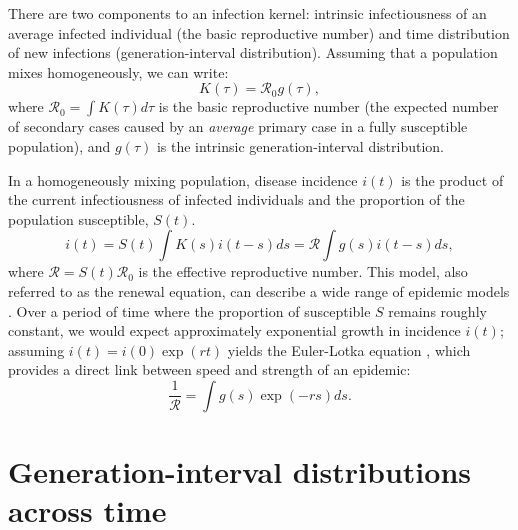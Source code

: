 \documentclass[12pt]{article}
\newcommand{\RR}{\ensuremath{{\mathcal R}}}
\newcommand{\comment}[3]{\textcolor{#1}{\textbf{[#2: }\textsl{#3}\textbf{]}}}
\newcommand{\jd}[1]{\comment{cyan}{JD}{#1}}
\newcommand{\dc}[1]{\comment{blue}{DC}{#1}}
\begin{document}
There are two components to an infection kernel: intrinsic infectiousness of an average infected individual (the basic reproductive number) and time distribution of new infections (generation-interval distribution).
Assuming that a population mixes homogeneously, we can write: 
\begin{equation}
K(\tau) = \RR_0 g(\tau),
\end{equation}
where $\RR_0 = \int K(\tau) d\tau$ is the basic reproductive number (the expected number of secondary cases caused by an \emph{average} primary case in a fully susceptible population), 
and $g(\tau)$ is the intrinsic generation-interval distribution.

In a homogeneously mixing population, disease incidence $i(t)$ is the product of the current infectiousness of infected individuals and the proportion of the population susceptible, $S(t)$.
\begin{equation}
i(t) = S(t) \int K(s) i(t-s) ds = \RR \int g(s) i(t-s) ds,
\end{equation}
where $\RR = S(t) \RR_0$ is the effective reproductive number.
This model, also referred to as the renewal equation, can describe a wide range of epidemic models \citep{heesterbeek1996concept, diekmann2000mathematical, roberts2004modelling, aldis2005integral, wallinga2007generation, roberts2007model}.
Over a period of time where the proportion of susceptible $S$ remains roughly constant, we would expect approximately exponential growth in incidence $i(t)$; assuming $i(t) = i(0) \exp(r t)$ yields the Euler-Lotka equation \citep{lotka1907relation}, which provides a direct link between speed and strength of an epidemic:
\begin{equation}
\frac{1}{\RR} = \int g(s) \exp(-r s) ds.
\end{equation}

\section{Generation-interval distributions across time}

\end{document}
